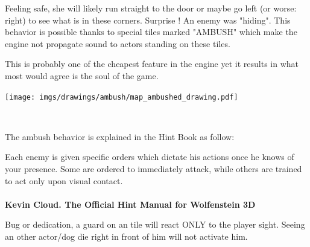 \par
\begin{minipage}{1\textwidth}
  \begin{figure}[H]
   \centering
  \end{figure}
  \par
  \begin{minipage}{0.6\textwidth}
  Feeling safe, she will likely run straight to the door or maybe go left (or worse: right) to see what is in these corners. Surprise ! An enemy was "hiding". This behavior is possible thanks to special tiles marked "AMBUSH" which make the engine not propagate sound to actors standing on these tiles.\\
  \par
   This is probably one of the cheapest feature in the engine yet it results in what most would agree is the soul of the game.
  \end{minipage}
  \begin{minipage}{0.4\textwidth}
  \begin{flushright}
  \texttt{[image: imgs/drawings/ambush/map\_ambushed\_drawing.pdf]}
  \end{flushright}
  \end{minipage}
\end{minipage}
\noindent
\\


\par

 The ambush behavior is explained in the Hint Book as follow:\\
\par
\begin{fancyquotes}
Each enemy is given specific orders which dictate his actions once he knows of your presence. Some are ordered to immediately attack, while others are trained to act only upon visual contact.
 \bigskip \\
\bigskip \\
\textbf{Kevin Cloud. The Official Hint Manual for Wolfenstein 3D}
 \end{fancyquotes}
\par
{} Bug or dedication, a guard on an  tile will react ONLY to the player sight. Seeing an other actor/dog die right in front of him will not activate him.\\


